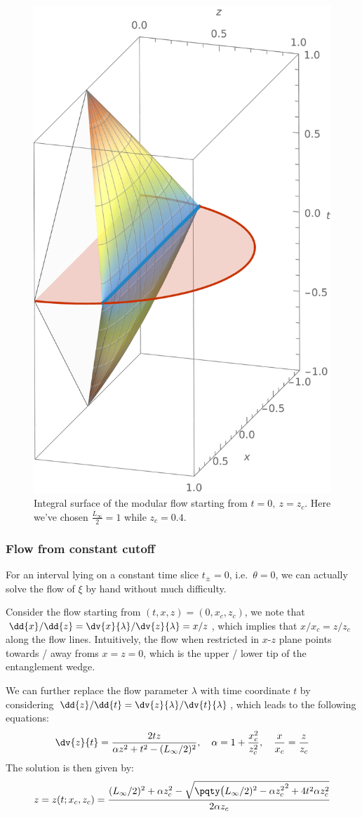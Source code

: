 \documentclass[a4paper
	,10pt
]{article}
\begin{document}
	\begin{figure}[!ht]
	\centering
	\includegraphics[width=.35\linewidth]{img/modFlowAnalytic.pdf}
	\caption{Integral surface of the modular flow starting from $t = 0,\ z = z_c$. Here we've chosen $\frac{L_\infty}{2} = 1$ while $z_c = 0.4$.}
	\end{figure}
	
\subsubsection{Flow from constant cutoff}
	For an interval lying on a constant time slice $t_\pm = 0$, i.e.~$\theta = 0$, we can actually solve the flow of $\xi$ by hand without much difficulty.
	
	Consider the flow starting from $(t,x,z) = (0,x_c,z_c)$, we note that $
		\dd{x}/\dd{z}
		= {\dv{x}{\lambda}}/{\dv{z}{\lambda}}
		= {x}/{z}
	$, which implies that ${x}/{x_c} = {z}/{z_c}$ along the flow lines. Intuitively, the flow when restricted in $x$-$z$ plane points towards / away froms $x = z = 0$, which is the upper / lower tip of the entanglement wedge. 
	
	We can further replace the flow parameter $\lambda$ with time coordinate $t$ by considering $
		\dd{z}/\dd{t}
		= {\dv{z}{\lambda}}/{\dv{t}{\lambda}}
	$, which leads to the following equations:
	\begin{equation}
		\dv{z}{t}
		= \frac{2tz}{\alpha z^2 + t^2 - (L_\infty/2)^2},
	\quad
		\alpha = 1 + \frac{x_c^2}{z_c^2},
	\quad
		\frac{x}{x_c} = \frac{z}{z_c}
	\end{equation}
	The solution is then given by:
	\begin{equation}
		z = z(t;x_c,z_c)
		= \frac{
				(L_\infty/2)^2 + \alpha z_c^2
				- \sqrt{
					\pqty\big{(L_\infty/2)^2 - \alpha z_c^2}^2
					+ 4t^2 \alpha z_c^2
				}
			}{2\alpha z_c}
	\end{equation}
	
\end{document}
